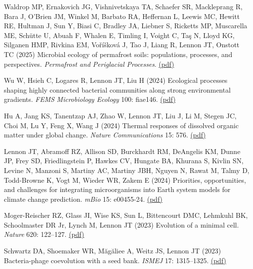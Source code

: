 \documentclass[11pt]{article}
\begin{document}
\begin{etaremune}
\item Waldrop MP, Ernakovich JG, Vishnivetskaya TA, Schaefer SR, Mackleprang R, Bara J, O'Brien JM, Winkel M, Barbato RA, Heffernan L, Leewis MC, Hewitt RE, Hultman J, Sun Y, Biasi C, Bradley JA, Liebner S, Ricketts MP, Muscarella ME, Schütte U, Abuah F, Whalen E, Timling I, Voight C, Taş N, Lloyd KG, Silganen HMP, Rivkina EM, Voříšková J, Tao J, Liang R, Lennon JT, Onstott TC (2025) Microbial ecology of permafrost soils: populations, processes, and perspectives. \textit{Permafrost and Periglacial Processes}. \href{https://lennonlab.github.io/assets/publications/Waldrop_etal_2025.pdf}{(pdf)}

\item Wu W, Hsieh C, Logares R, Lennon JT, Liu H (2024) Ecological processes shaping highly connected bacterial communities along strong environmental gradients. \textit{FEMS Microbiology Ecology} 100: fiae146. \href{https://lennonlab.github.io/assets/publications/Wu_etal_2024.pdf}{(pdf)}

\item Hu A, Jang KS, Tanentzap AJ, Zhao W, Lennon JT, Liu J, Li M, Stegen JC, Choi M, Lu Y, Feng X, Wang J (2024) Thermal responses of dissolved organic matter under global change. \textit{Nature Communications} 15: 576. \href{https://lennonlab.github.io/assets/publications/Hu_etal_2024.pdf}{(pdf)}

\item Lennon JT, Abramoff RZ, Allison SD, Burckhardt RM, DeAngelis KM, Dunne JP, Frey SD, Friedlingstein P, Hawkes CV, Hungate BA, Khurana S, Kivlin SN, Levine N, Manzoni S, Martiny AC, Martiny JBH, Nguyen N, Rawat M, Talmy D, Todd-Browne K, Vogt M, Wieder WR, Zakem E (2024) Priorities, opportunities, and challenges for integrating microorganisms into Earth system models for climate change prediction. \textit{mBio} 15: e00455-24. \href{https://lennonlab.github.io/assets/publications/Lennon_etal_2024.pdf}{(pdf)}

\item Moger-Reischer RZ, Glass JI, Wise KS, Sun L, Bittencourt DMC, Lehmkuhl BK, Schoolmaster DR Jr, Lynch M, Lennon JT (2023) Evolution of a minimal cell. \textit{Nature} 620: 122--127. \href{https://lennonlab.github.io/assets/publications/Moger-Reischer_etal_2023.pdf}{(pdf)}

\item Schwartz DA, Shoemaker WR, Măgăliee A, Weitz JS, Lennon JT (2023) Bacteria-phage coevolution with a seed bank. \textit{ISMEJ} 17: 1315–1325. \href{https://lennonlab.github.io/assets/publications/Schwartz_etal_2023b.pdf}{(pdf)}


\end{etaremune}
\end{document}
